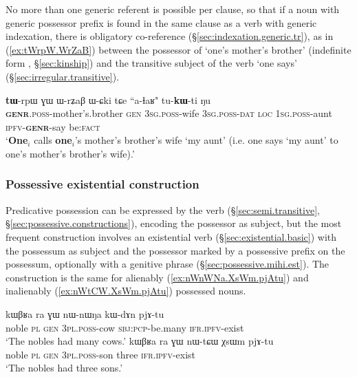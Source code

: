 No more than one generic referent is possible per clause, so that if a noun with generic possessor prefix is found in the same clause as a verb with generic indexation, there is obligatory co-reference (§\ref{sec:indexation.generic.tr}), as in (\ref{ex:tWrpW.WrZaB}) between the possessor of  `one's mother's brother' (indefinite form , §\ref{sec:kinship}) and the transitive subject of the verb  `one says' (§\ref{sec:irregular.transitive}).

\begin{exe}
\ex \label{ex:tWrpW.WrZaB}
\gll \textbf{tɯ}-rpɯ ɣɯ ɯ-rʑaβ ɯ-ɕki tɕe ``a-ɬaʁ" tu-\textbf{kɯ}-ti ŋu \\
\textsc{\textbf{genr}}.\textsc{poss}-mother's.brother \textsc{gen} \textsc{3sg}.\textsc{poss}-wife \textsc{3sg}.\textsc{poss}-\textsc{dat} \textsc{loc} \textsc{1sg}.\textsc{poss}-aunt \textsc{ipfv}-\textsc{\textbf{genr}}-say be:\textsc{fact} \\
\glt `\textbf{One}$_i$ calls \textbf{one}$_i$'s mother's brother's wife `my aunt' (i.e. one says `my aunt' to one's mother's brother's wife).' 
\end{exe}

\subsubsection{Possessive existential construction}
Predicative possession can be expressed by the verb  (§\ref{sec:semi.transitive}, §\ref{sec:possessive.constructions}), encoding the possessor as subject, but the most frequent construction involves an existential verb (§\ref{sec:existential.basic}) with the possessum as subject and the possessor marked by a possessive prefix on the possessum, optionally with a genitive phrase (§\ref{sec:possessive.mihi.est}). The construction is the same for alienably (\ref{ex:nWnWNa.XsWm.pjAtu}) and inalienably (\ref{ex:nWtCW.XsWm.pjAtu}) possessed nouns.
 

\begin{exe}
\ex 
\begin{xlist}
\ex \label{ex:nWnWNa.XsWm.pjAtu}
\gll  kɯβʁa ra ɣɯ nɯ-nɯŋa kɯ-dɤn pjɤ-tu \\
noble \textsc{pl} \textsc{gen} \textsc{3pl}.\textsc{poss}-cow \textsc{sbj}:\textsc{pcp}-be.many \textsc{ifr}.\textsc{ipfv}-exist \\
\glt `The nobles had many cows.'  
\ex \label{ex:nWtCW.XsWm.pjAtu}
\gll  kɯβʁa ra ɣɯ nɯ-tɕɯ χsɯm pjɤ-tu \\
noble \textsc{pl} \textsc{gen} \textsc{3pl}.\textsc{poss}-son three \textsc{ifr}.\textsc{ipfv}-exist \\
\glt `The nobles had three sons.'  
\end{xlist}
\end{exe}

